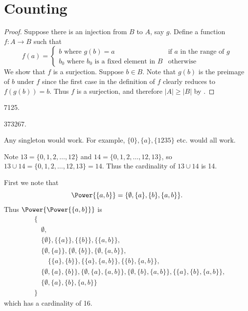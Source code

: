 \section{Counting}
\begin{questions}
    \item \begin{proof}
        Suppose there is an injection from $B$ to $A$, say $g$. Define a function $f: A \to B$ such that
        \[
            f(a) = \begin{cases}
                b \text{ where } g(b) = a & \text{if } a \text{ in the range of } g\\
                b_0 \text{ where } b_0 \text{ is a fixed element in } B & \text{otherwise}
            \end{cases} 
        \]
        We show that $f$ is a surjection. Suppose $b \in B$. Note that $g(b)$ is the preimage of $b$ under $f$ since the first case in the definition of $f$ clearly reduces to $f(g(b)) = b$. Thus $f$ is a surjection, and therefore $|A| \geq |B|$ by .
    \end{proof}

    \item \begin{partquestions}{\alph*}
        \item 7125.
        \item 373267.
        \item Any singleton would work. For example, $\{0\}, \{a\}, \{1235\}$ etc. would all work.
        \item Note $13 = \{0, 1, 2, \dots, 12\}$ and $14 = \{0, 1, 2, \dots, 12, 13\}$, so $13 \cup 14 = \{0, 1, 2, \dots, 12, 13\} = 14$. Thus the cardinality of $13 \cup 14$ is 14.
    \end{partquestions}

    \item First we note that
    \[
        \Power{\{a,b\}} = \{\emptyset, \{a\}, \{b\}, \{a, b\}\}.
    \]
    Thus $\Power{\Power{\{a, b\}}}$ is
    \begin{align*}
        &\{\\
        &\quad\emptyset,\\
        &\quad\{\emptyset\}, \{\{a\}\}, \{\{b\}\}, \{\{a, b\}\},\\
        &\quad\{\emptyset, \{a\}\}, \{\emptyset, \{b\}\}, \{\emptyset, \{a, b\}\},\\
        &\quad\quad\{\{a\}, \{b\}\},\{\{a\}, \{a,b\}\}, \{\{b\}, \{a,b\}\},\\
        &\quad\{\emptyset, \{a\}, \{b\}\},\{\emptyset, \{a\}, \{a,b\}\},\{\emptyset, \{b\}, \{a,b\}\},\{\{a\}, \{b\}, \{a,b\}\},\\
        &\quad\{\emptyset, \{a\}, \{b\}, \{a, b\}\}\\
        &\}
    \end{align*}
    which has a cardinality of 16.


\end{questions}

